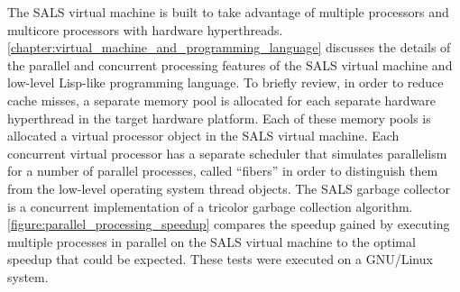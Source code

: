 The SALS virtual machine is built to take advantage of multiple
processors and multicore processors with hardware hyperthreads.
{\mbox{\autoref{chapter:virtual_machine_and_programming_language}}}
discusses the details of the parallel and concurrent processing
features of the SALS virtual machine and low-level Lisp-like
programming language.  To briefly review, in order to reduce cache
misses, a separate memory pool is allocated for each separate hardware
hyperthread in the target hardware platform.  Each of these memory
pools is allocated a virtual processor object in the SALS virtual
machine.  Each concurrent virtual processor has a separate scheduler
that simulates parallelism for a number of parallel processes, called
``fibers'' in order to distinguish them from the low-level operating
system thread objects.  The SALS garbage collector is a concurrent
implementation of a tricolor garbage collection algorithm.
{\mbox{\autoref{figure:parallel_processing_speedup}}} compares the
speedup gained by executing multiple processes in parallel on the SALS
virtual machine to the optimal speedup that could be expected.  These
tests were executed on a GNU/Linux system.
